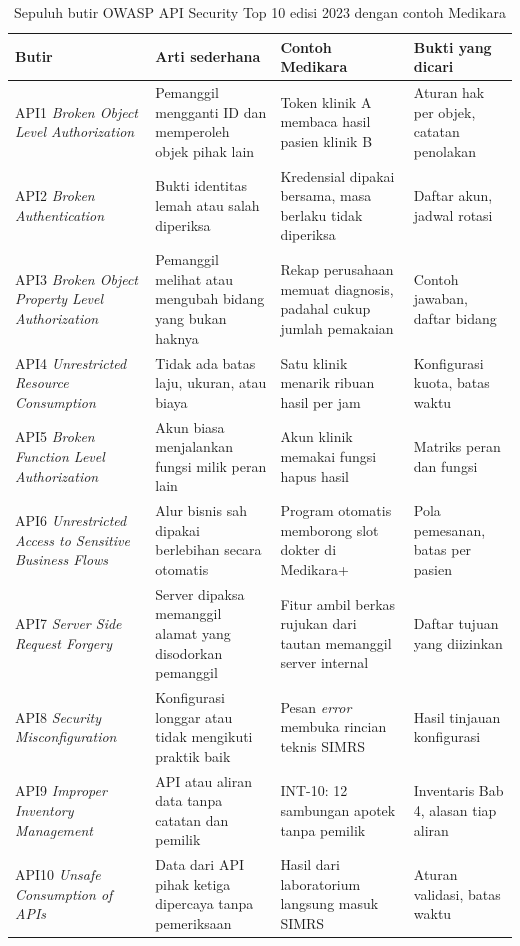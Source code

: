 \begin{table}[!htb]
  \centering
  \caption{Sepuluh butir OWASP API Security Top 10 edisi 2023 dengan contoh Medikara}
  \label{tab:ch06-owasp}
  \footnotesize
  \begin{tabularx}{\textwidth}{T{2.9cm}QQT{2.4cm}}
    \hline
    \textbf{Butir} & \textbf{Arti sederhana} & \textbf{Contoh Medikara} & \textbf{Bukti yang dicari} \\ \hline
    API1 \textit{Broken Object Level Authorization} & Pemanggil mengganti ID dan memperoleh objek pihak lain & Token klinik A membaca hasil pasien klinik B & Aturan hak per objek, catatan penolakan \\ \hline
    API2 \textit{Broken Authentication} & Bukti identitas lemah atau salah diperiksa & Kredensial dipakai bersama, masa berlaku tidak diperiksa & Daftar akun, jadwal rotasi \\ \hline
    API3 \textit{Broken Object Property Level Authorization} & Pemanggil melihat atau mengubah bidang yang bukan haknya & Rekap perusahaan memuat diagnosis, padahal cukup jumlah pemakaian & Contoh jawaban, daftar bidang \\ \hline
    API4 \textit{Unrestricted Resource Consumption} & Tidak ada batas laju, ukuran, atau biaya & Satu klinik menarik ribuan hasil per jam & Konfigurasi kuota, batas waktu \\ \hline
    API5 \textit{Broken Function Level Authorization} & Akun biasa menjalankan fungsi milik peran lain & Akun klinik memakai fungsi hapus hasil & Matriks peran dan fungsi \\ \hline
    API6 \textit{Unrestricted Access to Sensitive Business Flows} & Alur bisnis sah dipakai berlebihan secara otomatis & Program otomatis memborong slot dokter di Medikara+ & Pola pemesanan, batas per pasien \\ \hline
    API7 \textit{Server Side Request Forgery} & Server dipaksa memanggil alamat yang disodorkan pemanggil & Fitur ambil berkas rujukan dari tautan memanggil server internal & Daftar tujuan yang diizinkan \\ \hline
    API8 \textit{Security Misconfiguration} & Konfigurasi longgar atau tidak mengikuti praktik baik & Pesan \textit{error} membuka rincian teknis SIMRS & Hasil tinjauan konfigurasi \\ \hline
    API9 \textit{Improper Inventory Management} & API atau aliran data tanpa catatan dan pemilik & INT-10: 12 sambungan apotek tanpa pemilik & Inventaris Bab 4, alasan tiap aliran \\ \hline
    API10 \textit{Unsafe Consumption of APIs} & Data dari API pihak ketiga dipercaya tanpa pemeriksaan & Hasil dari laboratorium langsung masuk SIMRS & Aturan validasi, batas waktu \\ \hline
  \end{tabularx}
\end{table}


